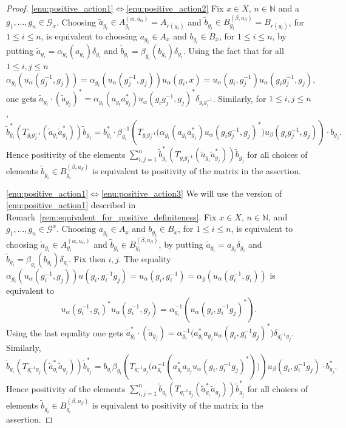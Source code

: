 \documentclass[11 pt, leqno]{amsart}
\numberwithin{equation}{section}
\theoremstyle{plain}
\theoremstyle{definition}
\renewcommand{\star}{*}
\newcommand{\G}{\mathcal G} %
\newcommand{\N}{\mathbb N}
\begin{document}
\begin{proof} 
\ref{enu:positive_action1}$\iff$\ref{enu:positive_action2} Fix $x \in X$, $n \in \N$ and a $g_1 , \ldots , g_n \in \G_x$.  
Choosing $\tilde{a}_{g_i} \in A_{g_i}^{(\alpha,u_{\alpha})} = A_{r(g_i)}$ and $\tilde{b}_{g_i} \in B_{g_i}^{(\beta,u_{\beta})} = B_{r(g_i)}$, for $1 \leq i \leq n$, is equivalent to choosing $a_{g_i} \in A_{x}$ and $b_{g_i} \in B_{x}$, for $1 \leq i \leq n$, by putting $\tilde{a}_{g_i} = \alpha_{g_i}(a_{g_i}) \delta_{g_i}$ and $\tilde{b}_{g_i} = \beta_{g_i}(b_{g_i})\delta_{g_i}$.
Using the fact that for all $1 \leq i,j \leq n$
\[
    \alpha_{g_i}(u_{\alpha}(g_j^{-1} , g_j)) = \alpha_{g_i}(u_{\alpha}(g_j^{-1},g_j))u_{\alpha}(g_i,x) = u_{\alpha}(g_i,g_j^{-1})u_{\alpha}(g_i g_j^{-1},g_j) , 
\]
one gets $\tilde{a}_{g_i} \cdot (\tilde{a}_{g_j})^{\star} = \alpha_{g_i}(a_{g_i} a_{g_j}^*)u_{\alpha}(g_i g_j^{-1},g_j)^*\delta_{g_i g_j^{-1}}$. 
Similarly, for $1 \leq i,j \leq n$, 
\[
    \tilde{b}_{g_i}^{\star} \left( T_{g_i g_j^{-1}} (\tilde{a}_{g_i} \tilde{a}_{g_j}^{\star} ) \right) \tilde{b}_{g_j} = b_{g_i}^* \cdot \beta_{g_i}^{-1} \left( T_{g_i g_j^{-1}} \big(\alpha_{g_i}(a_{g_i} a_{g_j}^*) u_{\alpha}(g_i g_j^{-1} , g_j)^*\big) u_{\beta}(g_i g_j^{-1},g_j)\right)\cdot  b_{g_j}.
\]
Hence positivity of the elements $\sum_{i,j = 1}^n \tilde{b}_{g_i}^{\star} \left( T_{g_i g_j^{-1}} (\tilde{a}_{g_i} \tilde{a}_{g_j}^{\star}) \right) \tilde{b}_{g_j}$ for all choices of elements $\tilde{b}_{g_i} \in B_{g_i}^{(\beta,u_{\beta})}$ is equivalent to positivity of the matrix in the assertion.

\ref{enu:positive_action1}$\iff$\ref{enu:positive_action3} We will use the version of \ref{enu:positive_action1} described in Remark~\ref{rem:equivalent_for_positive_definiteness}.
Fix $x \in X$, $n \in \N$, and $g_1 , \ldots , g_n \in \G^x$. 
Choosing $a_{g_i} \in A_{x}$ and  $b_{g_i} \in B_{x}$, for $1 \leq i \leq n$, is equivalent to choosing $\tilde{a}_{g_i} \in A_{g_i}^{(\alpha,u_{\alpha})}$ and $\tilde{b}_{g_i} \in B_{g_i}^{(\beta,u_{\beta})}$, by putting $\tilde{a}_{g_i} = a_{g_i} \delta_{g_i}$ and $\tilde{b}_{g_i} = \beta_{g_i}(b_{g_i}) \delta_{g_i}$. 
Fix then $i,j$.
The equality $\alpha_{g_i}(u_{\alpha}(g_i^{-1},g_j)) u(g_i , g_i^{-1} g_j) = u_{\alpha}(g_i , g_i^{-1}) = \alpha_{g}(u_{\alpha}(g_i^{-1},g_i))$ is equivalent to 
\[
    u_{\alpha}(g_i^{-1},g_i)^* u_{\alpha}(g_i^{-1},g_j) = \alpha_{g_i}^{-1}(u_{\alpha}(g_i , g_i^{-1} g_j)^*) .
\] 
Using the last equality one gets $\tilde{a}_{g_i}^{\star} \cdot (\tilde{a}_{g_j}) = \alpha_{g_i}^{-1} \big( a_{g_i}^* a_{g_j} u_{\alpha}(g_i , g_i^{-1} g_j)^* \big) \delta_{g_i^{-1} g_j}$. 
Similarly,
\[
    \tilde{b}_{g_i} \left( T_{g_i^{-1} g_j} (\tilde{a}_{g_i}^{\star} \tilde{a}_{g_j}) \right) \tilde{b}_{g_j}^{\star} = b_{g_i}\beta_{g_i} \left(T_{g_i^{-1} g_j} \big( \alpha_{g_i}^{-1} (a_{g_i}^* a_{g_j} u_{\alpha}(g_i , g_i^{-1} g_j)^*) \big) \right) u_{\beta}(g_i , g_i^{-1} g_j) \cdot b_{g_j}^*.
\]
Hence positivity of the elements $\sum_{i,j = 1}^n \tilde{b}_{g_i} \left( T_{g_i^{-1} g_j} (\tilde{a}_{g_i}^{\star} \tilde{a}_{g_j}) \right) \tilde{b}_{g_j}^{\star}$ for all choices of elements $\tilde{b}_{g_i} \in B_{g_i}^{(\beta,u_{\beta})}$ is equivalent to positivity of the matrix in the assertion. 
\end{proof}
\end{document}
